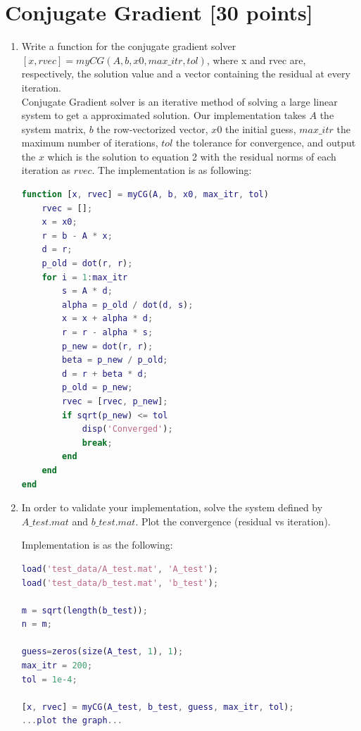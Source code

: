 \documentclass[unicode,11pt,a4paper,oneside,numbers=endperiod,openany]{scrartcl}
\begin{document}
\section{Conjugate Gradient [30 points]}

\begin{enumerate}
 \item Write a function for the conjugate gradient solver ${[x,rvec]=myCG(A,b,x0,max\_itr,tol)}$, where x
and rvec are, respectively, the solution value and a vector containing the residual at every iteration. \\

Conjugate Gradient solver is an iterative method of solving a large linear system to get a approximated solution. Our implementation takes ${A}$ the system matrix, ${b}$ the row-vectorized vector, ${x0}$ the initial guess, ${max\_itr}$ the maximum number of iterations, ${tol}$ the tolerance for convergence, and output the ${x}$ which is the solution to equation 2 with the residual norms of each iteration as ${rvec}$. The implementation is as following:

\begin{lstlisting}[language=Matlab]
 function [x, rvec] = myCG(A, b, x0, max_itr, tol)
    rvec = [];
    x = x0;
    r = b - A * x;
    d = r;
    p_old = dot(r, r);
    for i = 1:max_itr
        s = A * d;
        alpha = p_old / dot(d, s);
        x = x + alpha * d;
        r = r - alpha * s;
        p_new = dot(r, r);
        beta = p_new / p_old;
        d = r + beta * d;
        p_old = p_new;
        rvec = [rvec, p_new];
        if sqrt(p_new) <= tol
            disp('Converged');
            break;
        end
    end
end
\end{lstlisting}

\item In order to validate your implementation, solve the system defined by ${A\_test.mat}$ and ${b\_test.mat}$. Plot
the convergence (residual vs iteration).
\vspace{20px}

Implementation is as the following:

\begin{lstlisting}[language=Matlab]
load('test_data/A_test.mat', 'A_test');
load('test_data/b_test.mat', 'b_test');

m = sqrt(length(b_test));
n = m;

guess=zeros(size(A_test, 1), 1);
max_itr = 200;
tol = 1e-4;

[x, rvec] = myCG(A_test, b_test, guess, max_itr, tol);
...plot the graph...
\end{lstlisting}
\vspace{20px}


\end{enumerate}
\end{document}
